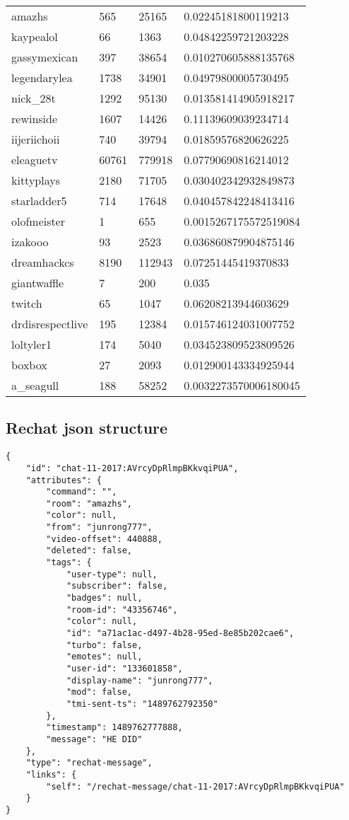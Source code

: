 \documentclass[final]{report} %
\begin{document}
\begin{appendices}
\begin{table}[]
\begin{tabular}{llll}
amazhs           & 565    & 25165   & 0.02245181800119213   \\
kaypealol        & 66     & 1363    & 0.04842259721203228   \\
gassymexican     & 397    & 38654   & 0.010270605888135768  \\
legendarylea     & 1738   & 34901   & 0.04979800005730495   \\
nick\_28t        & 1292   & 95130   & 0.013581414905918217  \\
rewinside        & 1607   & 14426   & 0.11139609039234714   \\
iijeriichoii     & 740    & 39794   & 0.01859576820626225   \\
eleaguetv        & 60761  & 779918  & 0.07790690816214012   \\
kittyplays       & 2180   & 71705   & 0.030402342932849873  \\
starladder5      & 714    & 17648   & 0.040457842248413416  \\
olofmeister      & 1      & 655     & 0.0015267175572519084 \\
izakooo          & 93     & 2523    & 0.036860879904875146  \\
dreamhackcs      & 8190   & 112943  & 0.07251445419370833   \\
giantwaffle      & 7      & 200     & 0.035                 \\
twitch           & 65     & 1047    & 0.06208213944603629   \\
drdisrespectlive & 195    & 12384   & 0.015746124031007752  \\
loltyler1        & 174    & 5040    & 0.034523809523809526  \\
boxbox           & 27     & 2093    & 0.012900143334925944  \\
a\_seagull       & 188    & 58252   & 0.0032273570006180045 \\
\end{tabular}
\end{table}


\subsection{Rechat json structure}
\begin{verbatim}
{
	"id": "chat-11-2017:AVrcyDpRlmpBKkvqiPUA",
	"attributes": {
		"command": "",
		"room": "amazhs",
		"color": null,
		"from": "junrong777",
		"video-offset": 440888,
		"deleted": false,
		"tags": {
			"user-type": null,
			"subscriber": false,
			"badges": null,
			"room-id": "43356746",
			"color": null,
			"id": "a71ac1ac-d497-4b28-95ed-8e85b202cae6",
			"turbo": false,
			"emotes": null,
			"user-id": "133601858",
			"display-name": "junrong777",
			"mod": false,
			"tmi-sent-ts": "1489762792350"
		},
		"timestamp": 1489762777888,
		"message": "HE DID"
	},
	"type": "rechat-message",
	"links": {
		"self": "/rechat-message/chat-11-2017:AVrcyDpRlmpBKkvqiPUA"
	}
}
\end{verbatim}



\end{appendices}
\end{document}
